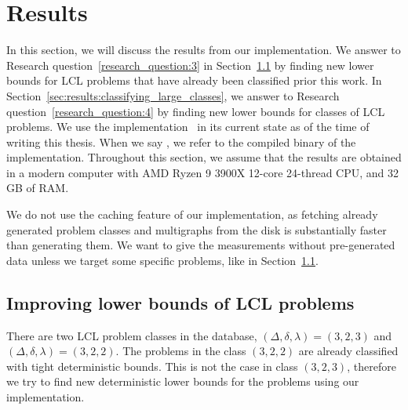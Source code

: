 
\section{Results} \label{sec:results}


In this section, we will discuss the results from our implementation.
We answer to Research question~\ref{research_question:3} in Section~\ref{sec:results:improving_bounds} by finding new lower bounds for LCL problems that have already been classified prior this work.
In Section~\ref{sec:results:classifying_large_classes}, we answer to Research question~\ref{research_question:4} by finding new lower bounds for classes of LCL problems.
We use the implementation~\cite[commit ]{NonconstantLclClassifier2022} in its current state as of the time of writing this thesis.
When we say , we refer to the compiled binary of the implementation.
Throughout this section, we assume that the results are obtained in a modern computer with AMD Ryzen 9 3900X 12-core 24-thread CPU, and 32 GB of RAM.

We do not use the caching feature of our implementation, as fetching already generated problem classes and multigraphs from the disk is substantially faster than generating them.
We want to give the measurements without pre-generated data unless we target some specific problems, like in Section~\ref{sec:results:improving_bounds}.



%
%
\subsection{Improving lower bounds of LCL problems}\label{sec:results:improving_bounds}
There are two LCL problem classes in the database, $(\Delta, \delta, \lambda) = (3,2,3)$ and $(\Delta, \delta, \lambda) = (3,2,2)$.
The problems in the class $(3,2,2)$ are already classified with tight deterministic bounds.
This is not the case in class $(3,2,3)$, therefore we try to find new deterministic lower bounds for the problems using our implementation.

